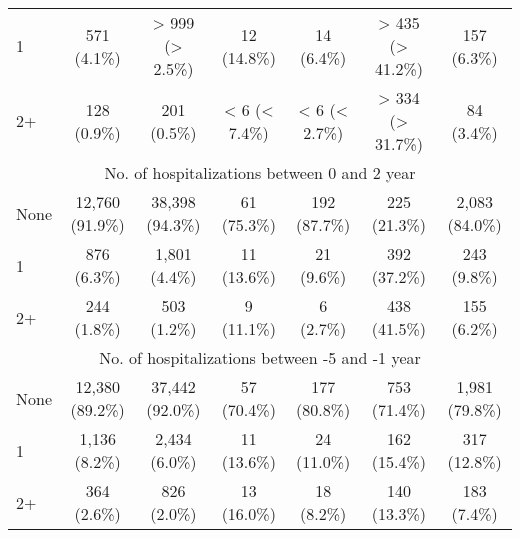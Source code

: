 \documentclass{article}
\begin{document}
\begin{table}[htbp]
\begin{tabular}{l*{6}{c}}
  1                                                     &           571 (4.1\%)           &         > 999 (> 2.5\%)         &           12 (14.8\%)           &            14 (6.4\%)           &         > 435 (> 41.2\%)        &           157 (6.3\%)           \\
  2+                                                    &           128 (0.9\%)           &           201 (0.5\%)           &          < 6 (< 7.4\%)          &          < 6 (< 2.7\%)          &         > 334 (> 31.7\%)        &            84 (3.4\%)           \\
\multicolumn{7}{c}{No. of hospitalizations between 0 and 2 year            }\\
  None                                                  &         12,760 (91.9\%)         &         38,398 (94.3\%)         &           61 (75.3\%)           &           192 (87.7\%)          &           225 (21.3\%)          &          2,083 (84.0\%)         \\
  1                                                     &           876 (6.3\%)           &          1,801 (4.4\%)          &           11 (13.6\%)           &            21 (9.6\%)           &           392 (37.2\%)          &           243 (9.8\%)           \\
  2+                                                    &           244 (1.8\%)           &           503 (1.2\%)           &            9 (11.1\%)           &            6 (2.7\%)            &           438 (41.5\%)          &           155 (6.2\%)           \\
\multicolumn{7}{c}{No. of hospitalizations between -5 and -1 year          }\\
  None                                                  &         12,380 (89.2\%)         &         37,442 (92.0\%)         &           57 (70.4\%)           &           177 (80.8\%)          &           753 (71.4\%)          &          1,981 (79.8\%)         \\
  1                                                     &          1,136 (8.2\%)          &          2,434 (6.0\%)          &           11 (13.6\%)           &           24 (11.0\%)           &           162 (15.4\%)          &           317 (12.8\%)          \\
  2+                                                    &           364 (2.6\%)           &           826 (2.0\%)           &           13 (16.0\%)           &            18 (8.2\%)           &           140 (13.3\%)          &           183 (7.4\%)           \\

\end{tabular}
\end{table}
\end{document}
